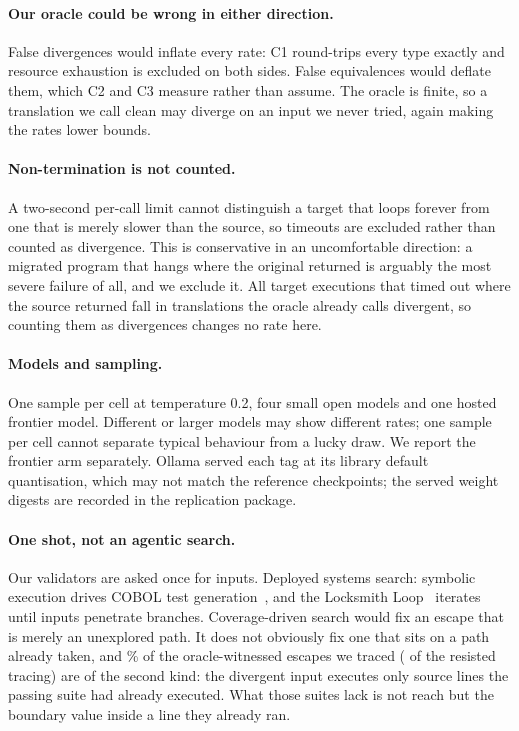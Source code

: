 \documentclass[sigconf]{acmart}
\begin{document}
\paragraph{Our oracle could be wrong in either direction.}
False divergences would inflate every rate: C1 round-trips every type exactly and resource
exhaustion is excluded on both sides. False equivalences would deflate them, which C2 and C3
measure rather than assume. The oracle is finite, so a translation we call clean may diverge on
an input we never tried, again making the rates lower bounds.

\paragraph{Non-termination is not counted.}
A two-second per-call limit cannot distinguish a target that loops forever from one that is
merely slower than the source, so timeouts are excluded rather than counted as divergence.
This is conservative in an uncomfortable direction: a migrated program that hangs where the
original returned is arguably the most severe failure of all, and we exclude it. All \TargetTimeouts{} target executions that timed out
where the source returned fall in translations the oracle already calls divergent, so counting
them as divergences changes no rate here.

\paragraph{Models and sampling.}
One sample per cell at temperature 0.2, four small open models and one hosted frontier model.
Different or larger models may show different rates; one sample per cell cannot separate
typical behaviour from a lucky draw. We report the frontier arm separately.
Ollama served each tag at its library default quantisation, which may not match the
reference checkpoints; the served weight digests are recorded in the replication package.

\paragraph{One shot, not an agentic search.}
Our validators are asked once for \KParity{} inputs. Deployed systems search: symbolic execution
drives COBOL test generation~\cite{kumar2024validation}, and the Locksmith
Loop~\cite{ferenczi2026locksmith} iterates until inputs penetrate branches. Coverage-driven search
would fix an escape that is merely an unexplored path. It does not obviously fix one that sits on
a path already taken, and \CovSamePath\% of the \CovEscapes{} oracle-witnessed escapes we
traced (\NTraceFailed{} of the \NEscapedOracleOnly{} resisted tracing) are of the second
kind: the divergent input executes only source lines the passing suite had already executed. What
those suites lack is not reach but the boundary value inside a line they already ran.
\end{document}
